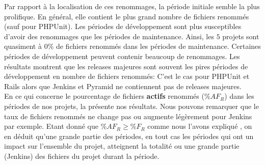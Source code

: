 Par rapport à la localisation de ces renommages, la période initiale semble la plus prolifique. En général, elle contient le plus grand nombre de fichiers renommés (sauf pour PHPUnit). Les périodes de développement sont plus susceptibles d'avoir des renommages que les périodes de maintenance. Ainsi, les $5$ projets sont quasiment à $0\%$ de fichiers renommés dans les périodes de maintenance. Certaines périodes de développement peuvent contenir beaucoup de renommages. Les résultats montrent que les releases majeures sont souvent les pires périodes de développement en nombre de fichiers renommés: C'est le cas pour PHPUnit et Rails alors que Jenkins et Pyramid ne contiennent pas de releases majeures.\\



En ce qui concerne le pourcentage de fichiers \textbf{actifs} renommés ($\%AF_R$) dans les périodes de nos projets, la  présente nos résultats. Nous pouvons remarquer que le taux de fichiers renommés ne change pas ou augmente légèrement pour Jenkins par exemple. Etant donné que $\%AF_R \geq \%F_R$ comme nous l'avons expliqué , on en déduit qu'une grande partie des périodes, en tout cas les périodes qui ont un impact sur l'ensemble du projet, atteignent la totalité ou une grande partie (Jenkins) des fichiers du projet durant la période.


